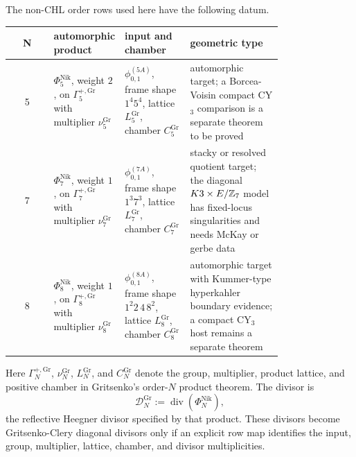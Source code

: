 \begin{proposition}
\label{prop:n578-nikulin-row-data}
The non-CHL order rows used here have the following datum.
\begin{center}
\begin{tabular}{c|p{0.20\linewidth}|p{0.24\linewidth}|p{0.34\linewidth}}
N & automorphic product & input and chamber & geometric type\\ \hline
5 &
\(\Phi_5^{\mathrm{Nik}}\), weight \(2\), on
\(\Gamma_{5}^{+,\mathrm{Gr}}\) with multiplier \(\nu_5^{\mathrm{Gr}}\)&
\(\phi_{0,1}^{(5A)}\), frame shape \(1^4 5^4\), lattice
\(L_5^{\mathrm{Gr}}\), chamber \(C_5^{\mathrm{Gr}}\)&
automorphic target; a Borcea-Voisin compact CY$_3$ comparison is a
separate theorem to be proved\\
7 &
\(\Phi_7^{\mathrm{Nik}}\), weight \(1\), on
\(\Gamma_{7}^{+,\mathrm{Gr}}\) with multiplier \(\nu_7^{\mathrm{Gr}}\)&
\(\phi_{0,1}^{(7A)}\), frame shape \(1^3 7^3\), lattice
\(L_7^{\mathrm{Gr}}\), chamber \(C_7^{\mathrm{Gr}}\)&
stacky or resolved quotient target; the diagonal \(K3\times E/\mathbb{Z}_7\)
model has fixed-locus singularities and needs McKay or gerbe data\\
8 &
\(\Phi_8^{\mathrm{Nik}}\), weight \(1\), on
\(\Gamma_{8}^{+,\mathrm{Gr}}\) with multiplier \(\nu_8^{\mathrm{Gr}}\)&
\(\phi_{0,1}^{(8A)}\), frame shape \(1^2 2\,4\,8^2\), lattice
\(L_8^{\mathrm{Gr}}\), chamber \(C_8^{\mathrm{Gr}}\)&
automorphic target with Kummer-type hyperkahler boundary evidence; a
compact CY$_3$ host remains a separate theorem
\end{tabular}
\end{center}
Here \(\Gamma_N^{+,\mathrm{Gr}}\), \(\nu_N^{\mathrm{Gr}}\),
\(L_N^{\mathrm{Gr}}\), and \(C_N^{\mathrm{Gr}}\) denote the group,
multiplier, product lattice, and positive chamber in Gritsenko's
order-\(N\) product theorem.  The divisor is
\[
  \mathcal D_N^{\mathrm{Gr}}:=\operatorname{div}(\Phi_N^{\mathrm{Nik}}),
\]
the reflective Heegner divisor specified by that product.  These
divisors become Gritsenko-Clery diagonal divisors only if an explicit
row map identifies the input, group, multiplier, lattice, chamber, and
divisor multiplicities.
\end{proposition}


